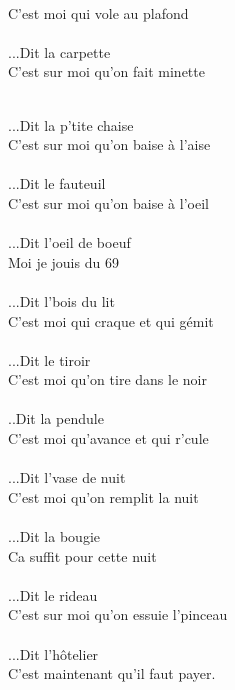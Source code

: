 \\C'est moi qui vole au plafond
\\\\...Dit la carpette
\\C'est sur moi qu'on fait minette
\\\\
\begin{minipage}{0.6\textwidth}
...Dit la p'tite chaise 
\\C'est sur moi qu'on baise à l'aise
\\\\...Dit le fauteuil
\\C'est sur moi qu'on baise à l'oeil
\\\\...Dit l'oeil de boeuf
\\Moi je jouis du 69
\\\\...Dit l'bois du lit
\\C'est moi qui craque et qui gémit
\\\\...Dit le tiroir
\\C'est moi qu'on tire dans le noir
\\\\..Dit la pendule
\\C'est moi qu'avance et qui r'cule
\\\\...Dit l'vase de nuit
\\C'est moi qu'on remplit la nuit
\\\\...Dit la bougie
\\Ca suffit pour cette nuit
\\\\...Dit le rideau
\\C'est sur moi qu'on essuie l'pinceau
\\\\...Dit l'hôtelier
\\C'est maintenant qu'il faut payer.
\end{minipage}
